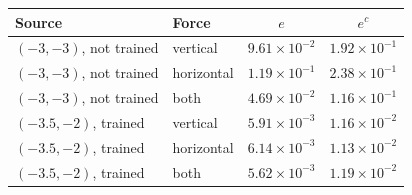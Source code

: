 \begin{tabular}{llcc}
\toprule
Source & Force & $e$ & $e^c$ \\
\midrule
$(-3,-3)$, not trained & vertical & $9.61\times 10^{-2}$ & $1.92\times 10^{-1}$ \\
$(-3,-3)$, not trained & horizontal & $1.19\times 10^{-1}$ & $2.38\times 10^{-1}$ \\
$(-3,-3)$, not trained & both & $4.69\times 10^{-2}$ & $1.16\times 10^{-1}$ \\
$(-3.5,-2)$, trained & vertical & $5.91\times 10^{-3}$ & $1.16\times 10^{-2}$ \\
$(-3.5,-2)$, trained & horizontal & $6.14\times 10^{-3}$ & $1.13\times 10^{-2}$ \\
$(-3.5,-2)$, trained & both & $5.62\times 10^{-3}$ & $1.19\times 10^{-2}$ \\
\bottomrule
\end{tabular}
